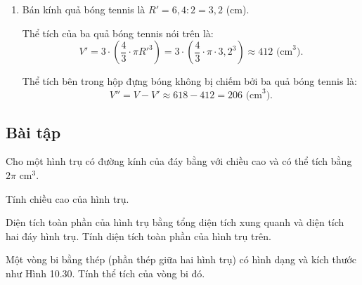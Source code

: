 \begin{exercises}
\begin{enumerate}[label=\alph*)]
        \item Bán kính quả bóng tennis là $R'=6{,}4:2=3{,}2$ (cm).

        Thể tích của ba quả bóng tennis nói trên là:
        \[
            V'=3\cdot\left(\dfrac{4}{3}\cdot\pi R'^3\right)=3\cdot\left(\dfrac{4}{3}\cdot\pi\cdot 3{,}2^3\right)\approx 412\text{ (cm}^3\text{)}.
        \]

        Thể tích bên trong hộp đựng bóng không bị chiếm bởi ba quả bóng tennis là:
        \[
            V''=V-V'\approx 618-412=206\text{ (cm}^3\text{)}.
        \]
    \end{enumerate}

    \subsection{Bài tập}

    \begin{questions}[resume=SGK]
        \item Cho một hình trụ có đường kính của đáy bằng với chiều cao và có thể tích bằng $2\pi$ cm$^3$.
        \begin{questions}
            \item Tính chiều cao của hình trụ.

            \answerline
            \answerline

            \item Diện tích toàn phần của hình trụ bằng tổng diện tích xung quanh và diện tích hai đáy hình trụ. Tính diện tích toàn phần của hình trụ trên.

            \answerline
            \answerline
            \answerline
        \end{questions}

        \item Một vòng bi bằng thép (phần thép giữa hai hình trụ) có hình dạng và kích thước như Hình 10.30. Tính thể tích của vòng bi đó.

        \begin{center}
\end{center}
\end{questions}
\end{exercises}
